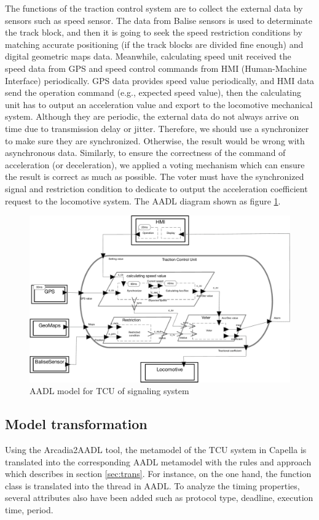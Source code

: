 The functions of the traction control system are to collect the external data by sensors such as speed sensor. The data from Balise sensors is used to determinate the track block, and then it is going to seek the speed restriction conditions by matching accurate positioning (if the track blocks are divided fine enough) and digital geometric maps data. Meanwhile, calculating speed unit received the speed data from GPS and speed control commands from HMI (Human-Machine Interface) periodically. GPS data provides speed value periodically, and HMI data send the operation command (e.g., expected speed value), then the calculating unit has to output an acceleration value and export to the locomotive mechanical system. Although they are periodic, the external data do not always arrive on time due to transmission delay or jitter. Therefore, we should use a synchronizer to make sure they are synchronized. Otherwise, the result would be wrong with asynchronous data. Similarly, to ensure the correctness of the command of acceleration (or deceleration), we applied a voting mechanism which can ensure the result is correct as much as possible. The voter must have the synchronized signal and restriction condition to dedicate to output the acceleration coefficient request to the locomotive system. The AADL diagram shown as figure \ref{fig:tcus}.     

\begin{figure}[!h]
\centering
\includegraphics[width=.75\linewidth]{img/TCU_all}
\caption{AADL model for TCU of signaling system}
\label{fig:tcus}
\end{figure}




\subsection{Model transformation}
Using the Arcadia2AADL tool, the metamodel of the TCU system in Capella is translated into the corresponding AADL metamodel with the rules and approach which describes in section \ref{sec:trans}. For instance, on the one hand, the function class is translated into the thread in AADL. To analyze the timing properties, several attributes also have been added such as protocol type, deadline, execution time, period. 

